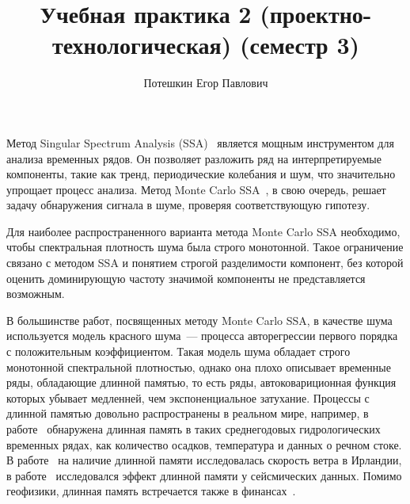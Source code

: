 \documentclass[specialist,
substylefile = spbu_report.rtx,
subf,12pt]{disser}
\theoremstyle{definition}
\begin{document}
%
%

\title{Учебная практика 2 (проектно-технологическая) (семестр 3)}


\author{Потешкин Егор Павлович}


\date{\number\year}

\maketitle

\tableofcontents

\intro
Метод Singular Spectrum Analysis (SSA)~\cite{Broomhead1986,Golyandina2001} является мощным инструментом для анализа временных рядов. Он позволяет разложить ряд на интерпретируемые компоненты, такие как тренд, периодические колебания и шум, что значительно упрощает процесс анализа. Метод Monte Carlo SSA~\cite{Allen1996}, в свою очередь, решает задачу обнаружения сигнала в шуме, проверяя соответствующую гипотезу.

Для наиболее распространенного варианта метода Monte Carlo SSA необходимо, чтобы спектральная плотность шума была строго монотонной. Такое ограничение связано с методом SSA и понятием строгой разделимости компонент, без которой оценить доминирующую частоту значимой компоненты не представляется возможным.

В большинстве работ, посвященных методу Monte Carlo SSA, в качестве шума используется модель красного шума~--- процесса авторегрессии первого порядка с положительным коэффициентом. Такая модель шума обладает строго монотонной спектральной плотностью, однако она плохо описывает временные ряды, обладающие длинной памятью, то есть ряды, автоковариционная функция которых убывает медленней, чем экспоненциальное затухание. Процессы с длинной памятью довольно распространены в реальном мире, например, в работе~\cite{Hipel1994} обнаружена длинная память в таких среднегодовых гидрологических временных рядах, как количество осадков, температура и данных о речном стоке. В работе~\cite{Haslett1989} на наличие длинной памяти исследовалась скорость ветра в Ирландии, в работе~\cite{Mariani2020} исследовался эффект длинной памяти у сейсмических данных. Помимо геофизики, длинная память встречается также в финансах~\cite{Barkoulas1997,Guglielmo2019}.
\end{document}
